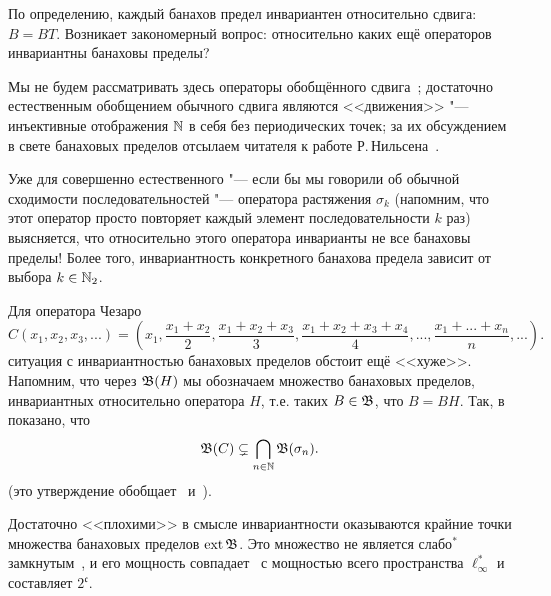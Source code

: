 По определению, каждый банахов предел инвариантен относительно сдвига: $B=BT$.
Возникает закономерный вопрос: относительно каких ещё операторов инвариантны банаховы пределы?

Мы не будем рассматривать здесь операторы обобщённого сдвига~\cite{marchenko2006generalized,lewitan1945normed};
достаточно естественным обобщением обычного сдвига являются <<движения>> "--- инъективные отображения $\mathbb{N}$ в себя без периодических точек; за их обсуждением в свете банаховых пределов отсылаем читателя к работе Р.\,Нильсена~\cite{Nillsen}.

Уже для совершенно естественного "--- если бы мы говорили об обычной сходимости последовательностей "---
оператора растяжения $\sigma_k$
(напомним, что этот оператор просто повторяет каждый элемент последовательности $k$ раз)
выясняется, что относительно этого оператора инварианты не все банаховы пределы!
Более того, инвариантность конкретного банахова предела зависит от выбора $k\in\mathbb{N}_2$.

Для оператора Чезаро
\begin{equation}
	C (x_1, x_2, x_3, ...) = \left(
	x_1,
	\dfrac{x_1+x_2}2,
	\dfrac{x_1+x_2 + x_3}3,
	\dfrac{x_1+x_2+x_3+x_4}4,
	...,
	\dfrac{x_1+...+x_n}n,
	...\right)
	.
\end{equation}
ситуация с инвариантностью банаховых пределов обстоит ещё <<хуже>>.
Напомним, что через $\mathfrak{B}(H)$ мы обозначаем множество банаховых пределов,
инвариантных относительно оператора $H$,
т.е. таких $B\in \mathfrak{B}$, что $B=BH$.
Так, в~\cite[\S2, Theorem 4]{semenov2020dilation} показано, что
\begin{equation}
	\mathfrak{B}(C) \subsetneq \bigcap_{n\in \mathbb{N}}\mathfrak{B}(\sigma_n)
	.
\end{equation}
(это утверждение обобщает~\cite[Theorem 3]{semenov2020invariant_noncommutative}
и~\cite[Theorem 4.8]{ASSU4}).




Достаточно <<плохими>> в смысле инвариантности оказываются крайние точки множества банаховых пределов $\operatorname{ext} \mathfrak{B}$.
Это множество не является слабо$^*$ замкнутым~\cite{Nillsen,Talagrand},
и его мощность совпадает~\cite{Chou} с мощностью всего пространства $\ell_\infty^*$
и составляет $2^{\mathfrak c}$.



